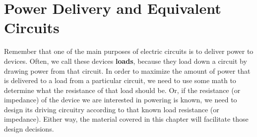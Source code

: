\chapter{Power Delivery and Equivalent Circuits}
\label{chap:powerSuppliesDelivery}
Remember that one of the main purposes of electric circuits is to deliver power to devices. Often, we call these devices \textbf{loads}, because they load down a circuit by drawing power from that circuit. In order to maximize the amount of power that is delivered to a load from a particular circuit, we need to use some math to determine what the resistance of that load should be. Or, if the resistance (or impedance) of the device we are interested in powering is known, we need to design its driving circuitry according to that known load resistance (or impedance). Either way, the material covered in this chapter will facilitate those design decisions.
\par
